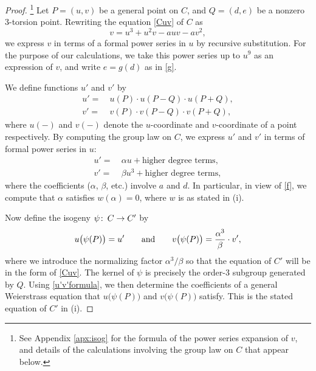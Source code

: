 \documentclass{gtpart}
\theoremstyle{definition}
\theoremstyle{remark}
\def\co{\colon\thinspace}
\newcommand{\ad}{{\rm and}}
\newcommand{\A}{\alpha}
\begin{document}
\begin{proof}
 \footnote{See Appendix \ref{apx:isog} for the formula of the power series expansion of $v$, 
 and details of the calculations involving the group law on $C$ that appear below.  }
 Let $P = (u,v)$ be a general point on $C$, and $Q = (d,e)$ be a nonzero 3-torsion point.  
 Rewriting the equation \eqref{Cuv} of $C$ as 
 \[
  v = u^3 + u^2 v - a u v - a v^2, 
 \]
 we express $v$ in terms of a formal power series in $u$ by recursive substitution.  
 For the purpose of our calculations, we take this power series up to $u^9$ as an expression of $v$, 
 and write $e = g(d)$ as in \eqref{g}.  

 We define functions $u'$ and $v'$ by 
 \begin{equation}
 \label{u'v'def}
 \begin{split}
  u' = & ~ u(P) \cdot u(P-Q) \cdot u(P+Q), \\
  v' = & ~ v(P) \cdot v(P-Q) \cdot v(P+Q), 
 \end{split}
 \end{equation}
 where $u(-)$ and $v(-)$ denote the $u$-coordinate and $v$-coordinate of a point respectively.  
 By computing the group law on $C$, we express $u'$ and $v'$ in terms of formal power series in $u$: 
 \begin{equation}
 \label{u'v'formula}
 \begin{split}
  u' = & ~ \A u + \text{higher degree terms}, \\
  v' = & ~ \beta u^3 + \text{higher degree terms}, 
 \end{split}
 \end{equation}
 where the coefficients ($\A$, $\beta$, etc.) involve $a$ and $d$.  
 In particular, in view of \eqref{f}, we compute that $\A$ satisfies $w(\A) = 0$, where $w$ is as stated in (i).  

 Now define the isogeny $\psi \co C \to C'$ by 
 \begin{equation}
 \label{psi}
  u\big(\psi(P)\big) = u' \qquad \ad \qquad v\big(\psi(P)\big) = \frac{\A^3}{\beta} \cdot v', 
 \end{equation}
 where we introduce the normalizing factor $\A^3 / \beta$ so that the equation of $C'$ will be in the form of \eqref{Cuv}.  
 The kernel of $\psi$ is precisely the order-3 subgroup generated by $Q$.  
 Using \eqref{u'v'formula}, we then determine the coefficients of a general Weierstrass equation that $u\big(\psi(P)\big)$ and $v\big(\psi(P)\big)$ satisfy.  
 This is the stated equation of $C'$ in (i).  


\end{proof}
\end{document}
